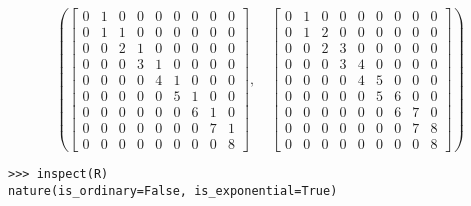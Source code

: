 \begin{example}
\begin{displaymath}
\left ( \left[\begin{matrix}0 & 1 & 0 & 0 & 0 & 0 & 0 & 0 & 0\\0 & 1 & 1 & 0 & 0 & 0 & 0 & 0 & 0\\0 & 0 & 2 & 1 & 0 & 0 & 0 & 0 & 0\\0 & 0 & 0 & 3 & 1 & 0 & 0 & 0 & 0\\0 & 0 & 0 & 0 & 4 & 1 & 0 & 0 & 0\\0 & 0 & 0 & 0 & 0 & 5 & 1 & 0 & 0\\0 & 0 & 0 & 0 & 0 & 0 & 6 & 1 & 0\\0 & 0 & 0 & 0 & 0 & 0 & 0 & 7 & 1\\0 & 0 & 0 & 0 & 0 & 0 & 0 & 0 & 8\end{matrix}\right], \quad \left[\begin{matrix}0 & 1 & 0 & 0 & 0 & 0 & 0 & 0 & 0\\0 & 1 & 2 & 0 & 0 & 0 & 0 & 0 & 0\\0 & 0 & 2 & 3 & 0 & 0 & 0 & 0 & 0\\0 & 0 & 0 & 3 & 4 & 0 & 0 & 0 & 0\\0 & 0 & 0 & 0 & 4 & 5 & 0 & 0 & 0\\0 & 0 & 0 & 0 & 0 & 5 & 6 & 0 & 0\\0 & 0 & 0 & 0 & 0 & 0 & 6 & 7 & 0\\0 & 0 & 0 & 0 & 0 & 0 & 0 & 7 & 8\\0 & 0 & 0 & 0 & 0 & 0 & 0 & 0 & 8\end{matrix}\right]\right )
\end{displaymath}
\begin{verbatim}
>>> inspect(R)
nature(is_ordinary=False, is_exponential=True)
\end{verbatim}
\end{example}


